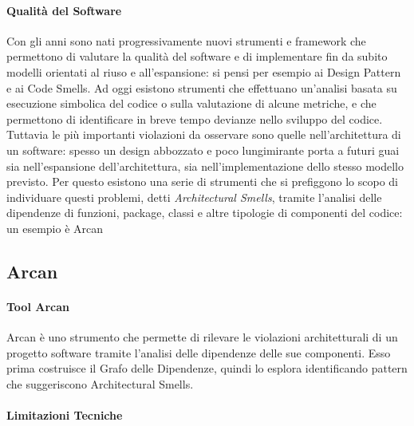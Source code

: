 \paragraph{Qualit\`a del Software}

Con gli anni sono nati progressivamente nuovi strumenti e framework che permettono di valutare la qualit\`a del software e di implementare fin da subito modelli orientati al riuso e all'espansione: si pensi per esempio ai Design Pattern \cite{gamma1995design} e ai Code Smells\cite{fowler1999refactoring}. Ad oggi esistono strumenti che effettuano un'analisi basata su esecuzione simbolica del codice o sulla valutazione di alcune metriche, e che permettono di identificare in breve tempo devianze nello sviluppo del codice. Tuttavia le pi\`u importanti violazioni da osservare sono quelle nell'architettura di un software: spesso un design abbozzato e poco lungimirante porta a futuri guai sia nell'espansione dell'architettura, sia nell'implementazione dello stesso modello previsto. Per questo esistono una serie di strumenti che si prefiggono lo scopo di individuare questi problemi, detti \emph{Architectural Smells}, tramite l'analisi delle dipendenze di funzioni, package, classi e altre tipologie di componenti del codice: un esempio \`e Arcan \cite{Arcan}

\subsection{Arcan}

\paragraph{Tool Arcan}

Arcan \`e uno strumento che permette di rilevare le violazioni architetturali di un progetto software tramite l'analisi delle dipendenze delle sue componenti. Esso prima costruisce il Grafo delle Dipendenze, quindi lo esplora identificando pattern che suggeriscono Architectural Smells.



\paragraph{Limitazioni Tecniche}

